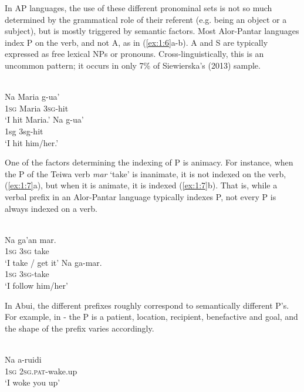 In AP languages, the use of these different pronominal sets is not so much determined by the grammatical role of their referent (e.g. being an object or a subject), but is mostly triggered by semantic factors. Most Alor-Pantar languages index P on the verb, and not A, as in (\ref{ex:1:6}a-b). A and S are typically expressed as free lexical NPs or pronouns. Cross-linguistically, this is an uncommon pattern; it occurs in only 7\% of Siewierska's (2013) sample.\nocite{Siewierska2013}



\ea%
\label{ex:1:6}
\\
\ea
\gll Na  Maria  g-ua' \\
 1\textsc{sg} Maria  \textsc{3sg-}hit     \\
\glt  `I hit Maria.'
\ex
\gll Na  g-ua' \\
 1sg  3sg-hit    \\
\glt  `I hit him/her.'
\z
\z
 


One of the factors determining the indexing of P is animacy. For instance, when the P of the Teiwa verb \textit{mar} `take' is inanimate, it is not indexed on the verb, (\ref{ex:1:7}a), but when it  is animate, it is indexed (\ref{ex:1:7}b). That is, while a verbal prefix in an Alor-Pantar language typically indexes P, not every P is always indexed on a verb.



\ea%
\label{ex:1:7}
\\
\gll Na  ga'an  mar. \\
  1\textsc{sg} 3\textsc{sg} take     \\
\glt `I take / get it'
\ex
\gll Na  ga-mar. \\
1\textsc{sg} 3\textsc{sg}{}-take  \\
\glt  `I follow him/her'
\z
  


In Abui, the different prefixes roughly correspond to semantically different P's. For example, in - the P is a patient, location, recipient, benefactive and goal, and the shape of the prefix varies accordingly.



\ea%
\label{ex:1:8}
 \\
\gll Na   a-ruidi  \\
 \textsc{1sg}   \textsc{2sg.pat}{}-wake.up  \\
\glt  `I woke you up' 
\z
            



